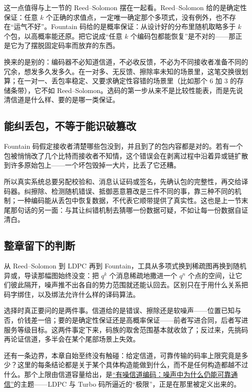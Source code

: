 这一点值得与上一节的 Reed--Solomon 摆在一起看。Reed--Solomon 给的是确定性保证：任意 \(k\) 个正确的求值点，一定唯一确定那个多项式，没有例外，也不存在``运气不好''。Fountain 码给的是概率保证：从设计好的分布里随机取略多于 \(k\) 个包，以高概率能还原。把它说成``任意 \(k\) 个编码包都能恢复''是不对的——那正是它为了摆脱固定码率而放弃的东西。

换来的是别的：编码器不必知道信道，不必收反馈，不必为不同接收者准备不同的冗余，想发多久发多久。在一对多、无反馈、擦除率未知的场景里，这笔交换很划算；在一对一、丢包率稳定、又要求确定性容错的场景里（比如那个 6 加 3 的存储条带），它不如 Reed--Solomon。选码的第一步从来不是比较性能表，而是先说清信道是什么样、要的是哪一类保证。

\subsection{能纠丢包，不等于能识破篡改}

Fountain 码假定接收者清楚哪些包没到，并且到了的包内容都是对的。若有一个包被悄悄改了几个比特而接收者不知情，这个错误会在剥离过程中沿着异或链扩散到许多原始包上——一个坏包毁掉一大片，比丢了它还糟。

所以真实系统总要另配校验和、消息认证码或签名，先确认包的完整性，再交给译码器。纠擦除、检测随机错误、抵御恶意篡改是三件不同的事，靠三种不同的机制；一种编码能从丢包中恢复数据，不代表它顺带提供了真实性。这也是上一节末尾那句话的另一面：与其让纠错机制去猜哪一份数据可疑，不如让每一份数据自证清白。

\subsection{整章留下的判断}

从 Reed--Solomon 到 LDPC 再到 Fountain，工具从多项式换到稀疏图再换到随机异或，导读那幅图始终没变：把 \(q^k\) 个消息稀疏地撒进一个 \(q^n\) 个点的空间，让它们彼此隔开，噪声推不出各自的势力范围就还能认回去。区别只在于用什么关系把码字绑住，以及绑法允许什么样的译码算法。

选择时真正要问的是两件事。信道给的是错误、擦除还是软噪声——位置已知与否，价钱差一倍；要的是确定性保证还是高概率保证——前者写进合同，后者写进服务等级目标。这两件事定下来，码族的取舍范围基本就收敛了；反过来，先挑码再论证信道，多半会在某个尾部场景上失效。

还有一条边界，本章自始至终没有触碰：给定信道，可靠传输的码率上限究竟是多少？这里的每条结论都是关于某个具体构造能做到什么，而不是任何构造都越不过什么。那个上限由信道容量给出，是\hyperref[ch:058]{``有噪信道编码：噪声中为什么仍能可靠通信''}的主题——LDPC 与 Turbo 码所逼近的``极限''，正是在那里被定义出来的。
